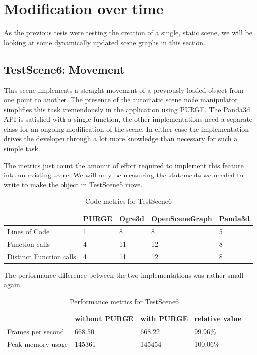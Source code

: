 \section{Modification over time}

	As the previous tests were testing the creation of a single, static scene, we will be looking at some dynamically updated scene graphs in this section.

	\subsection{TestScene6: Movement}

		This scene implements a straight movement of a previously loaded object from one point to another. The presence of the automatic scene node manipulator simplifies this task tremendously in the application using PURGE. The Panda3d API is satisfied with a single function, the other implementations need a separate class for an ongoing modification of the scene. In either case the implementation drives the developer through a lot more knowledge than necessary for such a simple task.

		The metrics just count the amount of effort required to implement this feature into an existing scene. We will only be measuring the statements we needed to write to make the object in TestScene5 move.

		\begin{table}[htpb]
			\center
			\begin{tabular}{l | l | l | l | l}
				& PURGE & Ogre3d & OpenSceneGraph & Panda3d\\ \hline
				Lines of Code & 1 & 8 & 8 & 5\\
				Function calls & 4 & 11 & 12 & 8\\
				Distinct Function calls & 4 & 11 & 12 & 8\\
			\end{tabular}
			\caption{Code metrics for TestScene6}
		\end{table}

		The performance difference between the two implementations was rather small again.

		\begin{table}[htpb]
			\center
			\caption{Performance metrics for TestScene6}
			\begin{tabular}{l | l | l | l}
				& without PURGE & with PURGE & relative value\\ \hline
				Frames per second & 668.50 & 668.22 & 99.96\%\\
				Peak memory usage & 145361 & 145454 & 100.06\%\\
			\end{tabular}
			\label{tbl:Performance6}
		\end{table}

